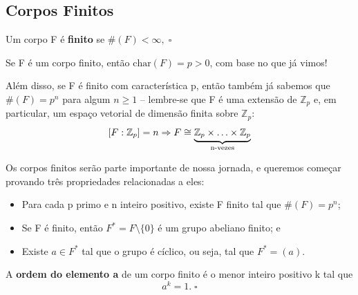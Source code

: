 \documentclass[../algebraIII_notes.tex]{subfiles}
\begin{document}
\subsection{Corpos Finitos}
\begin{def*}
	Um corpo F é \textbf{finito} se \(\# (F)<\infty,\; \square\)
\end{def*}
\begin{tcolorbox}[
		skin=enhanced,
		title=Observação,
		fonttitle=\bfseries,
		colframe=black,
		colbacktitle=cyan!75!white,
		colback=cyan!15,
		colbacklower=black,
		coltitle=black,
		drop fuzzy shadow,
	]
	Se F é um corpo finito, então \(\mathrm{char}(F)=p>0\), com base no que já vimos!

	Além disso, se F é finito com característica p, então também já sabemos que \(\#(F)=p^{n}\) para algum \(n\geq 1\) -- lembre-se que F é uma extensão de \(\mathbb{Z}_{p}\) e, em particular, um espaço vetorial de dimensão finita sobre \(\mathbb{Z}_{p}\):
	\[
		[F:\mathbb{Z}_{p}]=n \Rightarrow F\cong \underbrace{\mathbb{Z}_{p}\times \dotsc \times \mathbb{Z}_{p}}_{\mathclap{\text{n-vezes}}}
	\]
\end{tcolorbox}

Os corpos finitos serão parte importante de nossa jornada, e queremos começar provando três propriedades relacionadas a eles:
\begin{itemize}
	\item[1)] Para cada p primo e n inteiro positivo, existe F finito tal que \(\#(F)=p^{n}\);
	\item[2)] Se F é finito, então \(F^{*}=F\setminus{\{0\}}\) é um grupo abeliano finito; e
	\item[3)] Existe \(a\in F^{*}\) tal que o grupo é cíclico, ou seja, tal que \(F^{*}=(a)\).
\end{itemize}
\begin{def*}
	A \textbf{ordem do elemento a} de um corpo finito é o menor inteiro positivo k tal que
	\[
		a^{k}=1. \; \square
	\]
\end{def*}
\end{document}
